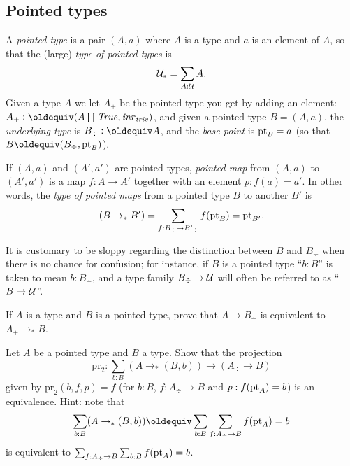 \subsection{Pointed types}
\label{sec:poitedtypes}
\begin{definition}\label{def:pointedtypes}
  A \emph{pointed type} is a pair $(A,a)$ where $A$ is a type and $a$ is an element of $A$, so that the (large) \emph{type of pointed types} is
$$\mathcal{U}_*=\sum_{A:\mathcal{U}}A.$$
Given a type $A$ we let $A_+$ be the pointed type you get by adding an element: $A_+\defequi(A\coprod\true,\inr{\triv})$, and given a pointed type $B=(A,a)$, the \emph{underlying type} is $B_\div\defequi A$, and the \emph{base point} is ${\mathord{\mathrm{pt}}}_B=a$ (so that $B\oldequiv (B_\div,\pt_B)$).  

If $(A,a)$ and $(A',a')$ are pointed types,  \emph{pointed map} from  $(A,a)$ to $(A',a')$ is a map $f:A\to A'$ together with an element $p:f(a)=a'$.  In other words, the \emph{type of pointed maps} from a pointed type $B$ to another $B'$ is
$$(B\to_*B')=\sum_{f:B_\div\to B'{}_\div}f({\mathord{\mathrm{pt}}}_B)={\mathord{\mathrm{pt}}}_{B'}.$$
\end{definition}
\begin{remark}
  It is customary to be sloppy regarding the distinction between $B$ and $B_\div$  when there is no chance for confusion; for instance, if $B$ is a pointed type ``$b:B$'' is taken to mean $b:B_\div$, and a type family $B_\div\to\mathcal{U}$ will often be referred to as ``$B\to\mathcal{U}$''.
\end{remark}

\begin{xca}\label{xca:plusforgetadjoint}
  If $A$ is a type and $B$ is a pointed type, prove that $A\to B_\div$ is equivalent to $A_+\to_*B$.
\end{xca}
\begin{xca}\label{xca:freemaps}
  Let $A$ be a pointed type and $B$ a type.  Show that the projection  
$$\mathrm{pr}_2:\sum_{b:B}(A\to_*(B,b))\to (A_\div\to B)$$
given by $\mathrm{pr}_2(b,f,p)=f$ (for $b:B$, $f:A_\div\to B$ and $p:f({\mathord{\mathrm{pt}}}_A)=b$) is an equivalence.
Hint: note that 
$$\sum_{b:B}(A\to_*(B,b))\oldequiv \sum_{b:B}\sum_{f:A_\div\to B}f(\pt_A)=b$$ is equivalent to $\sum_{f:A_\div\to B}\sum_{b:B}f({\mathord{\mathrm{pt}}}_A)=b$.
\end{xca}


